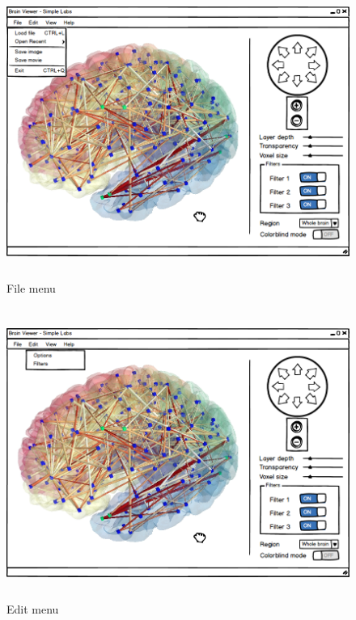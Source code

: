 \begin{figure}[h!]
\centering
\includegraphics[width=16cm,height=9.5cm]{images/mockup2.png}
\caption{File menu}
\label{fig:fileMenu}
\end{figure}


\begin{figure}[h!]
\centering
\includegraphics[width=16cm,height=9.5cm]{images/mockup3.png}
\caption{Edit menu}
\label{fig:editMenu}
\end{figure}


